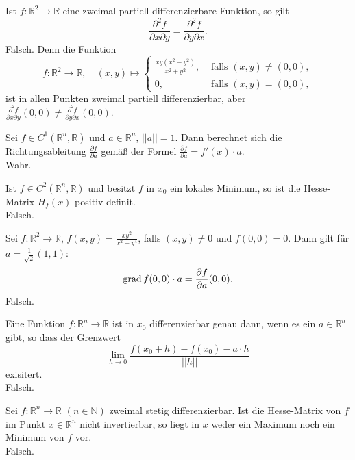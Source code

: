 \documentclass[parskip=full]{scrartcl}
\begin{document}
Ist $f : \mathbb{R}^2 \to \mathbb{R}$ eine zweimal partiell differenzierbare Funktion, so gilt
\begin{displaymath}
  \frac{\partial^2 f}{\partial x \partial y} = \frac{\partial^2 f}{\partial y \partial x}.
\end{displaymath}
Falsch.
Denn die Funktion
\begin{displaymath}
  f : \mathbb{R}^2 \to \mathbb{R}, \quad (x,y) \mapsto
  \begin{cases}
    \frac{xy(x^2 - y^2)}{x^2 + y^2},& \text{ falls } (x,y) \neq (0,0),\\
    0,& \text{ falls } (x,y) = (0,0),
  \end{cases}
\end{displaymath}
ist in allen Punkten zweimal partiell differenzierbar, aber $\frac{\partial^2 f}{\partial x \partial y}(0,0) \neq \frac{\partial^2 f}{\partial y \partial x}(0,0)$.

Sei $f \in C^1(\mathbb{R}^n, \mathbb{R})$ und $a \in \mathbb{R}^n$, $||a|| = 1$.
Dann berechnet sich die Richtungsableitung $\frac{\partial f}{\partial a}$ gemäß der Formel $\frac{\partial f}{\partial a} = f'(x) \cdot a$.\\
Wahr.

Ist $f \in C^2(\mathbb{R}^n, \mathbb{R})$ und besitzt $f$ in $x_0$ ein lokales Minimum, so ist die Hesse-Matrix $H_f(x)$ positiv definit.\\
Falsch.

Sei $f : \mathbb{R}^2 \to \mathbb{R}$, $f(x,y) = \frac{xy^2}{x^2 + y^4}$, falls $(x,y) \neq 0$ und $f(0,0) = 0$.
Dann gilt für $a = \frac{1}{\sqrt{2}}(1,1)$:
\begin{displaymath}
  \operatorname{grad} f(0,0) \cdot a = \frac{\partial f}{\partial a}(0,0).
\end{displaymath}
Falsch.

Eine Funktion $f : \mathbb{R}^n \to \mathbb{R}$ ist in $x_0$ differenzierbar genau dann, wenn es ein $a \in \mathbb{R}^n$ gibt, so dass der Grenzwert
\begin{displaymath}
  \lim_{h \to 0} \frac{f(x_0 + h) - f(x_0) - a \cdot h}{||h||}
\end{displaymath}
exisitert.\\
Falsch.

Sei $f : \mathbb{R}^n \to \mathbb{R}$ $(n \in \mathbb{N})$ zweimal stetig differenzierbar.
Ist die Hesse-Matrix von $f$ im Punkt $x \in \mathbb{R}^n$ nicht invertierbar, so liegt in $x$ weder ein Maximum noch ein Minimum von $f$ vor.\\
Falsch.
\end{document}

